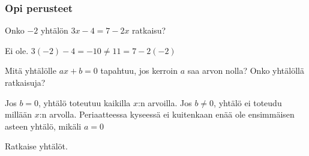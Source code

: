 \begin{tehtavasivu}


\subsubsection*{Opi perusteet}

\begin{tehtava}
Onko $-2$ yhtälön $3x-4 = 7-2x$ ratkaisu?
\begin{vastaus}
Ei ole. $3(-2)-4 = -10 \ne 11=7-2(-2)$
\end{vastaus}
\end{tehtava}

\begin{tehtava}
Mitä yhtälölle $ax+b = 0$ tapahtuu, jos kerroin $a$ saa arvon nolla?
Onko yhtälöllä ratkaisuja?
\begin{vastaus}
Jos $b = 0$, yhtälö toteutuu kaikilla $x$:n arvoilla. Jos $b \neq 0$, yhtälö
ei toteudu millään $x$:n arvolla. Periaatteessa kyseessä ei kuitenkaan
enää ole ensimmäisen asteen yhtälö, mikäli $a = 0$
\end{vastaus}
\end{tehtava}

Ratkaise yhtälöt.

\begin{tehtava}
%
\begin{alakohdat}
\end{alakohdat}
\begin{vastaus}
\begin{alakohdat}
\end{alakohdat}
\end{vastaus}
\end{tehtava}


\begin{tehtava}
\begin{alakohdat}
\end{alakohdat}
\begin{vastaus}
\begin{alakohdat}
\end{alakohdat}
\end{vastaus}
\end{tehtava}


\end{tehtavasivu}
